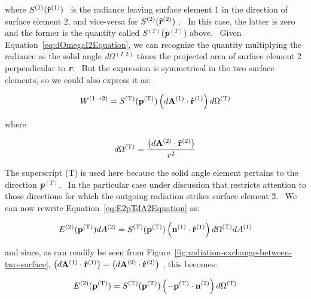 where \({S^{{\rm{(1)}}}}({{\bf{\hat r}}^{{\rm{(1)}}}})\) ~is the radiance leaving surface element 1 in the direction of surface element 2, and vice-versa for \({S^{{\rm{(2)}}}}({{\bf{\hat r}}^{{\rm{(2)}}}})\) .~ In this case, the latter is zero and the former is the quantity called \emph{S}\(^{(T)}\)(\textbf{\emph{p}}\(^{(T)}\)) above.~ Given Equation~\ref{eq:dOmegaI2Equation}, we can recognize the quantity multiplying the radiance as the solid angle \emph{d}\(\Omega\)\(^{(I,2)}\) times the projected area of surface element 2 perpendicular to \textbf{\emph{r}}.~ But the expression is symmetrical in the two surface elements, so we could also express it as:

\begin{equation}
{W^{(1 \to 2)}} = {S^{{\rm{(T)}}}}({{\bf{p}}^{{\rm{(T)}}}})\left( {d{{\bf{A}}^{{\rm{(1)}}}} \cdot {{{\bf{\hat r}}}^{{\rm{(1)}}}}} \right)d{\Omega ^{{\rm{(T)}}}}
\end{equation}

where

\begin{equation}
d{\Omega ^{{\rm{(T)}}}} = \frac{{\left( {d{{\bf{A}}^{{\rm{(2)}}}} \cdot {{{\bf{\hat r}}}^{{\rm{(2)}}}}} \right)}}{{{r^2}}}
\end{equation}

The superscript (T) is used here because the solid angle element pertains to the direction \textbf{\emph{p}}\(^{(T)}\).~ In the particular case under discussion that restricts attention to those directions for which the outgoing radiation strikes surface element 2.~ We can now rewrite Equation~\ref{eq:E2pTdA2Equation} as:

\begin{equation}
{E^{{\rm{(2)}}}}({{\bf{p}}^{{\rm{(T)}}}})d{A^{{\rm{(2)}}}} = {S^{{\rm{(T)}}}}({{\bf{p}}^{{\rm{(T)}}}})\left( {{{\bf{n}}^{{\rm{(1)}}}} \cdot {{{\bf{\hat r}}}^{{\rm{(1)}}}}} \right)d{\Omega ^{{\rm{(T)}}}}d{A^{{\rm{(1)}}}}
\label{eq:E2pTdA2Equation}
\end{equation}

and since, as can readily be seen from Figure~\ref{fig:radiation-exchange-between-two-surface}, \(\left( {d{{\bf{A}}^{{\rm{(1)}}}} \cdot {{{\bf{\hat r}}}^{{\rm{(1)}}}}} \right) = \left( {d{{\bf{A}}^{{\rm{(2)}}}} \cdot {{{\bf{\hat r}}}^{{\rm{(2)}}}}} \right)\) , this becomes:

\begin{equation}
{E^{{\rm{(2)}}}}({{\bf{p}}^{{\rm{(T)}}}}) = {S^{{\rm{(T)}}}}({{\bf{p}}^{{\rm{(T)}}}})\left( { - {{\bf{p}}^{{\rm{(T)}}}} \cdot {{\bf{n}}^{{\rm{(2)}}}}} \right)d{\Omega ^{{\rm{(T)}}}}
\end{equation}

